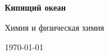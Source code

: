 \begin{titlepage}
  \centering
  \vspace*{2cm}
  {\LARGE\bfseries Кипящий океан\par}
  \vspace{0.8cm}
  {\Large Химия и физическая химия\par}
  \vfill
  {\large \today\par}
\end{titlepage}
\clearpage

\clearpage
\tableofcontents
\clearpage
